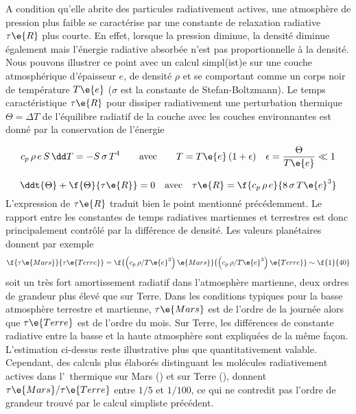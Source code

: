 A condition qu'elle abrite
des particules radiativement actives,
une atmosphère de pression
plus faible se caractérise par une constante
de relaxation radiative $\tau\e{R}$ plus
courte.
%
En effet, lorsque la pression
diminue, la densité diminue également
mais l'énergie radiative absorbée n'est
pas proportionnelle à la densité.
%
Nous pouvons illustrer ce point avec
un calcul simpl(ist)e sur une couche
atmosphérique d'épaisseur $e$, de densité $\rho$ 
et se comportant comme un corps noir
de température $T\e{e}$
($\sigma$ est la constante de Stefan-Boltzmann).
%
Le temps caractéristique $\tau\e{R}$ pour 
dissiper radiativement une
perturbation thermique $\Theta=\Delta T$
de l'équilibre radiatif de la couche
avec les couches environnantes est
donné par la conservation de l'énergie

\[
c_p \, \rho \, e \, S \, \dd T = - S \, \sigma \, T^4 \qquad \textrm{avec} \qquad T = T\e{e} \, (1 + \epsilon) \quad \epsilon = \frac{\Theta}{T\e{e}} \ll 1
\]

\[
\ddt{\Theta} + \f{\Theta}{\tau\e{R}} = 0
\quad \textrm{avec} \quad
\tau\e{R} = \f{c_p \, \rho \, e}{8 \, \sigma \, T\e{e}^3}
\]
%
\noindent L'expression de $\tau\e{R}$ traduit
bien le point mentionné précédemment.
%
Le rapport entre les constantes
de temps radiatives martiennes et terrestres
est donc principalement contrôlé
par la différence de densité.
%
Les valeurs planétaires donnent par exemple
%
\[
\f{ \tau\e{Mars} }{ \tau\e{Terre} }
=
\f{ \left( c_p \, \rho / T\e{e}^3 \right)\e{Mars} }{ \left( c_p \, \rho / T\e{e}^3 \right)\e{Terre} }
\sim 
\f{1}{40}
\]
%
\noindent soit un très fort amortissement
radiatif dans l'atmosphère martienne, deux ordres
de grandeur plus élevé que sur Terre.
%
Dans les conditions typiques pour la basse
atmosphère terrestre et martienne, 
$\tau\e{Mars}$ est de l'ordre de la journée
alors que $\tau\e{Terre}$ est de l'ordre du mois.
%
Sur Terre, les différences de constante radiative
entre la basse et la haute atmosphère sont expliquées
de la même façon.
%
L'estimation ci-dessus reste illustrative plus que quantitativement
valable.
%
Cependant, des calculs plus élaborés 
distinguant les molécules radiativement actives 
dans l'\IR~thermique sur Mars (\carb) et sur Terre (\eau),
donnent $\tau\e{Mars}/\tau\e{Terre}$
entre $1/5$ et $1/100$, ce qui
ne contredit pas l'ordre de grandeur
trouvé par le calcul simpliste
précédent. 
%
%
